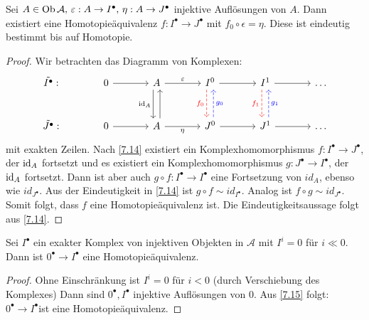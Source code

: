 \begin{fo}\label{7.15}
	Sei $A \in \text{Ob}\,\mathcal{A}, \,\varepsilon: A \to I^{\bullet}, \,\eta: A \to J^{\bullet}$ injektive Auflösungen von $A$. Dann existiert eine Homotopieäquivalenz $f:I^{\bullet} \to J^{\bullet} $ mit $ f_0 \circ \epsilon = \eta$. Diese ist eindeutig bestimmt bis auf Homotopie.
\end{fo}
\begin{proof}
	Wir betrachten das Diagramm von Komplexen: \\
	$$\begin{tikzcd}[column sep = large, row sep = large]
	\tilde{I^{\bullet}}: &0 \arrow{r} & A \arrow[xshift= -0.8 ex, swap]{d}{\id_A} \arrow{r}{\epsilon}& I^0 \arrow[dashed,red, swap, xshift= -0.8 ex]{d}{f_0}\arrow{r} & I^1 \arrow[dashed,red,xshift= -0.8 ex, swap ]{d}{f_1} \arrow{r} & \ldots\\
	\tilde{J^{\bullet}}:& 0 \arrow{r} & A \arrow[xshift=0.8 ex]{u}\arrow[swap]{r}{\eta} & J^0 \arrow[dashed, blue, xshift = 0.8 ex, swap]{u}{g_0} \arrow[swap]{r} & J^1 \arrow[dashed, blue, swap, xshift=0.8 ex]{u}{g_1} \arrow{r} & \ldots
	\end{tikzcd}$$
	mit exakten Zeilen. Nach \ref{7.14} existiert ein Komplexhomomorphismus $ f: I^{\bullet} \to J^{\bullet} $, der $\operatorname{id}_A $ fortsetzt und es existiert ein Komplexhomomorphismus $g: J^{\bullet} \to I^{\bullet}$, der $\operatorname{id}_A $ fortsetzt. Dann ist aber auch $g \circ f: I^{\bullet} \to I^{\bullet} $ eine Fortsetzung von $id_A$, ebenso wie $id_{J^{\bullet}}$. Aus der Eindeutigkeit in \ref{7.14} ist $ g \circ f \sim id_{I^{\bullet}}.$ Analog ist $f \circ g \sim id_{J^{\bullet}}.$ Somit folgt, dass $f$ eine Homotopieäquivalenz ist. Die Eindeutigkeitsaussage folgt aus \ref{7.14}.
\end{proof}
\begin{fo}
	Sei $I^{\bullet} $ ein exakter Komplex von injektiven Objekten in $\mathcal{A} $ mit $ I^i = 0 $ für $ i \ll 0$. Dann ist $0^{\bullet} \to I^{\bullet} $ eine Homotopieäquivalenz. 
\end{fo}
\begin{proof}
	Ohne Einschränkung ist $ I^i = 0 $ für $ i < 0 $ (durch Verschiebung des Komplexes) Dann sind $ 0^{\bullet}, I^{\bullet} $ injektive Auflösungen von 0. Aus \ref{7.15} folgt: $0^{\bullet} \to I^{\bullet} $ist eine Homotopieäquivalenz.
\end{proof} 